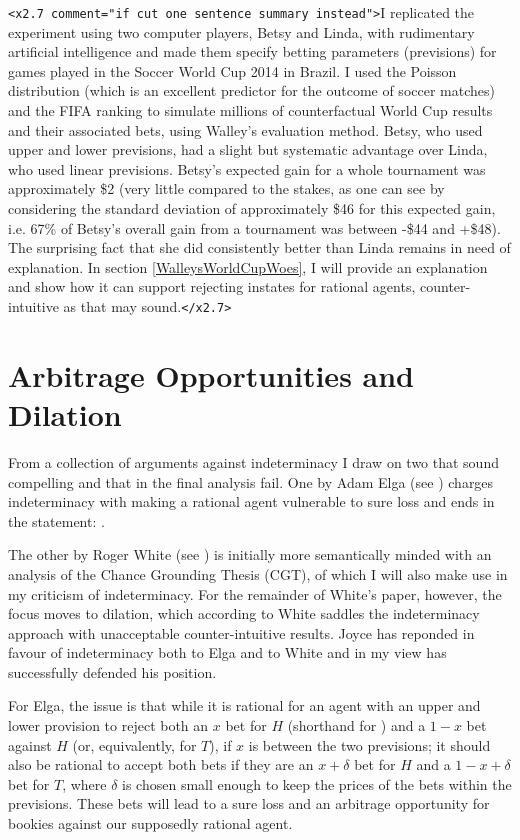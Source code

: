 \documentclass[11pt]{article}
\begin{document}
\texttt{<x2.7 comment="if cut one sentence summary instead">}I replicated the experiment using two computer players, Betsy and Linda, with rudimentary artificial intelligence and made them specify betting parameters (previsions) for games played in the Soccer World Cup 2014 in Brazil. I used the Poisson distribution (which is an excellent predictor for the outcome of soccer matches) and the FIFA ranking to simulate millions of counterfactual World Cup results and their associated bets, using Walley's evaluation method. Betsy, who used upper and lower previsions, had a slight but systematic advantage over Linda, who used linear previsions. Betsy's expected gain for a whole tournament was approximately \$2 (very little compared to the stakes, as one can see by considering the standard deviation of approximately \$46 for this expected gain, i.e. 67\% of Betsy's overall gain from a tournament was between -\$44 and +\$48). The surprising fact that she did consistently better than Linda remains in need of explanation. In section \ref{WalleysWorldCupWoes}, I will provide an explanation and show how it can support rejecting instates for rational agents, counter-intuitive as that may sound.\texttt{</x2.7>}

\section{Arbitrage Opportunities and Dilation}
\label{ArbitrageOpportunitiesAndDilation}

From a collection of arguments against indeterminacy I draw on two that sound compelling and that in the final analysis fail. One by Adam Elga (see ) charges indeterminacy with making a rational agent vulnerable to sure loss and ends in the statement:  .

The other by Roger White (see ) is initially more semantically minded with an analysis of the Chance Grounding Thesis (CGT), of which I will also make use in my criticism of indeterminacy. For the remainder of White's paper, however, the focus moves to dilation, which according to White saddles the indeterminacy approach with unacceptable counter-intuitive results. Joyce has reponded in favour of indeterminacy both to Elga and to White and in my view has successfully defended his position.

For Elga, the issue is that while it is rational for an agent with an upper and lower provision to reject both an $x$ bet for $H$ (shorthand for ) and a $1-x$ bet against $H$ (or, equivalently, for $T$), if $x$ is between the two previsions; it should also be rational to accept both bets if they are an $x+\delta$ bet for $H$ and a $1-x+\delta$ bet for $T$, where $\delta$ is chosen small enough to keep the prices of the bets within the previsions. These bets will lead to a sure loss and an arbitrage opportunity for bookies against our supposedly rational agent.
\end{document}
